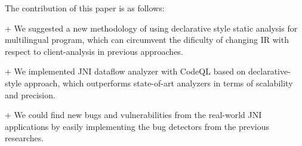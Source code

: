 The contribution of this paper is as follows:

+ We suggested a new methodology of using declarative style static analysis
for multilingual program, which can circumvent the dificulty of changing IR
with respect to client-analysis in previous approaches.

+ We implemented JNI dataflow analyzer with CodeQL based on declarative-style approach,
which outperforms state-of-art analyzers in terms of scalability and precision.

+ We could find new bugs and vulnerabilities from the real-world JNI applications
by easily implementing the bug detectors from the previous researches.
